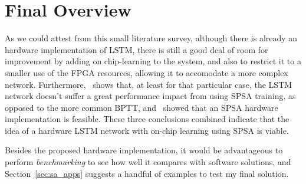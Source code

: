 \section{Final Overview}\label{sec:overview}
As we could attest from this small literature survey, although there is already an hardware implementation of LSTM, there is still a good deal of room for improvement by adding on chip-learning to the system, and also to restrict it to a smaller use of the FPGA resources, allowing it to accomodate a more complex network. Furthermore,~\cite{Tavear13} shows that, at least for that particular case, the LSTM network doesn't suffer a great performance impact from using SPSA training, as opposed to the more common BPTT, and~\cite{Maeda05} showed that an SPSA hardware implementation is feasible. These three conclusions combined indicate that the idea of a hardware LSTM network with on-chip learning using SPSA is viable. 

Besides the proposed hardware implementation, it would be advantageous to perform \emph{benchmarking} to see how well it compares with software solutions, and Section~\ref{sec:sa_apps} suggests a handful of examples to test my final solution.
